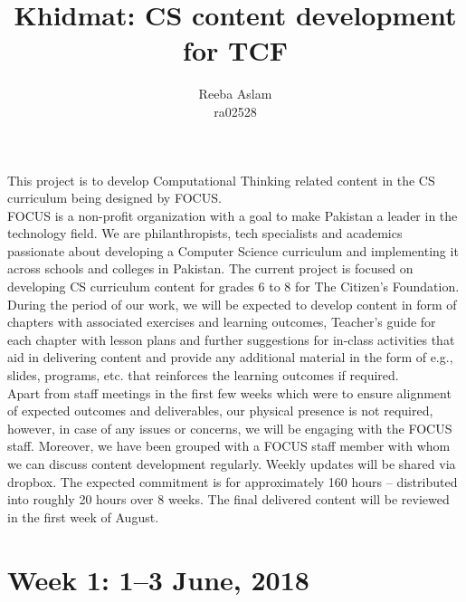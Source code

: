 \documentclass{article}
\title {Khidmat: CS content development for TCF}
\author{
  Reeba Aslam\\ra02528 
}
\date{}
\begin{document}
\maketitle


This project is to develop Computational Thinking related content in the CS curriculum being designed by FOCUS.\\

FOCUS is a non-profit organization with a goal to make Pakistan a leader in the technology field. We are philanthropists, tech specialists and academics passionate about developing a Computer Science curriculum and implementing it across schools and colleges in Pakistan.
The current project is focused on developing CS curriculum content for grades 6 to 8 for The Citizen's Foundation. \\

During the period of our work, we will be expected to develop content in form of chapters with associated exercises and learning outcomes, Teacher’s guide for each chapter with lesson plans and further suggestions for in-class activities that aid in delivering content and provide any additional material in the form of e.g., slides, programs, etc. that reinforces the learning outcomes if required.\\

Apart from staff meetings in the first few weeks which were to ensure alignment of expected outcomes and deliverables, our physical presence is not required, however, in case of any issues or concerns, we will be engaging with the FOCUS staff. 
Moreover, we have been grouped with a FOCUS staff member with whom we can discuss content development regularly. Weekly updates will be shared via dropbox. The expected commitment is for approximately 160 hours – distributed into roughly 20 hours over 8 weeks. The final delivered content will be reviewed in the first week of August.

\newpage %
\section*{Week 1: 1--3 June, 2018}
\end{document}
